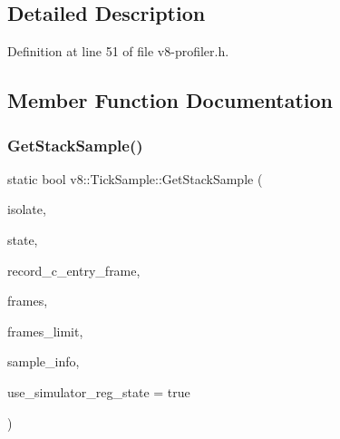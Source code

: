 \subsection{Detailed Description}


Definition at line 51 of file v8-\/profiler.\+h.



\subsection{Member Function Documentation}
\mbox{\label{structv8_1_1TickSample_a297e05d112f3c749bfead215393646c1}} 
\subsubsection{\texorpdfstring{Get\+Stack\+Sample()}{GetStackSample()}}
{\footnotesize\ttfamily static bool v8\+::\+Tick\+Sample\+::\+Get\+Stack\+Sample (\begin{DoxyParamCaption}\item[{Isolate $\ast$}]{isolate,  }\item[{\mbox{\hyperlink{structv8_1_1RegisterState}{v8\+::\+Register\+State}} $\ast$}]{state,  }\item[{Record\+C\+Entry\+Frame}]{record\+\_\+c\+\_\+entry\+\_\+frame,  }\item[{void $\ast$$\ast$}]{frames,  }\item[{size\+\_\+t}]{frames\+\_\+limit,  }\item[{\mbox{\hyperlink{structv8_1_1SampleInfo}{v8\+::\+Sample\+Info}} $\ast$}]{sample\+\_\+info,  }\item[{bool}]{use\+\_\+simulator\+\_\+reg\+\_\+state = {\ttfamily true} }\end{DoxyParamCaption})\hspace{0.3cm}{\ttfamily [static]}}

